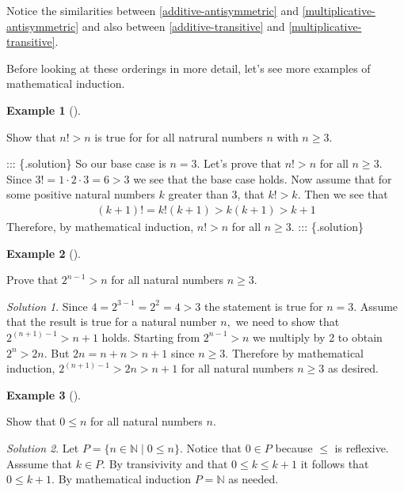 \documentclass[
  twoside,
  12pt,
  letterpaper]{article}
\theoremstyle{definition}
\theoremstyle{definition}
\theoremstyle{plain}
\theoremstyle{definition}
\newtheorem{example}{Example}[section]
\theoremstyle{plain}
\theoremstyle{remark}
\newtheorem*{solution}{Solution}
\begin{document}
Notice the similarities between \eqref{additive-antisymmetric} and
\eqref{multiplicative-antisymmetric} and also between
\eqref{additive-transitive} and \eqref{multiplicative-transitive}.

Before looking at these orderings in more detail, let's see more
examples of mathematical induction.

\begin{example}[]\protect\hypertarget{exm-}{}\label{exm-}

Show that \(n!>n\) is true for for all natrural numbers \(n\) with
\(n\geq 3\).

\end{example}

::: \{.solution\} So our base case is \(n=3\). Let's prove that \(n!>n\)
for all \(n\geq 3\). Since \(3!=1\cdot 2\cdot 3=6>3\) we see that the
base case holds. Now assume that for some positive natural numbers \(k\)
greater than 3, that \(k!>k.\) Then we see that \begin{align*} 
(k+1)! =k!(k+1) >k(k+1) >k+1
\end{align*} Therefore, by mathematical induction, \(n!>n\) for all
\(n\geq 3\). ::: \{.solution\}

\begin{example}[]\protect\hypertarget{exm-}{}\label{exm-}

Prove that \(2^{n-1}>n\) for all natural numbers \(n\geq 3.\)

\end{example}

\begin{solution}

Since \(4=2^{3-1}=2^2=4>3\) the statement is true for \(n=3.\) Assume
that the result is true for a natural number \(n,\) we need to show that
\(2^{(n+1)-1}>n+1\) holds. Starting from \(2^{n-1}>n\) we multiply by 2
to obtain \(2^n>2n.\) But \(2n=n+n>n+1\) since \(n\geq 3.\) Therefore by
mathematical induction, \(2^{(n+1)-1}>2n>n+1\) for all natural numbers
\(n\geq 3\) as desired.

\end{solution}

\begin{example}[]\protect\hypertarget{exm-zero-is-least}{}\label{exm-zero-is-least}

Show that \(0 \leq n\) for all natural numbers \(n\).

\end{example}

\begin{solution}

Let \(P=\{n\in \mathbb{N} \mid 0 \leq n \}\). Notice that \(0\in P\)
because \(\leq\) is reflexive. Asssume that \(k\in P\). By transivivity
and that \(0\leq k \leq k+1\) it follows that \(0\leq k+1.\) By
mathematical induction \(P=\mathbb{N}\) as needed.

\end{solution}
\end{document}
